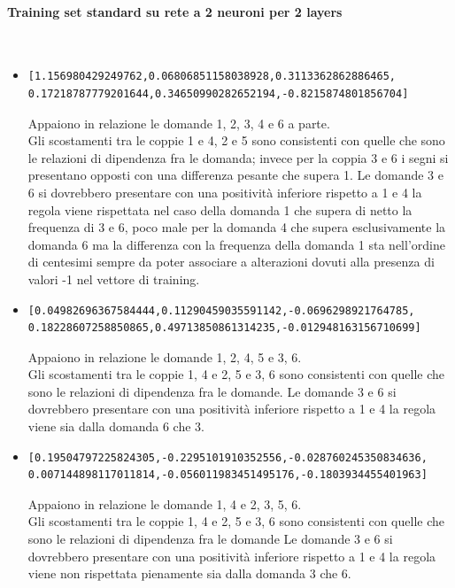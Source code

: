 \paragraph{Training set standard su rete a 2 neuroni per 2 layers}\mbox{}
\label{Training set standard su rete a 2 neuroni}
\\
\noindent
\begin{itemize}
\item \begin{verbatim}[1.156980429249762,0.06806851158038928,0.3113362862886465,
0.17218787779201644,0.34650990282652194,-0.8215874801856704]\end{verbatim}
Appaiono in relazione le domande 1, 2, 3, 4  e 6 a parte.\\
Gli scostamenti tra le coppie  1 e 4, 2 e 5 sono consistenti con quelle che sono le relazioni di dipendenza fra le domanda; invece per la coppia 3 e 6 i segni si presentano opposti  con una differenza pesante che supera 1.
Le domande 3 e 6 si dovrebbero presentare con una positivit\`a inferiore rispetto a 1 e 4 la regola viene rispettata nel caso della domanda 1 che supera di netto la frequenza di 3 e 6, poco male per la domanda 4 che supera esclusivamente la domanda 6 ma la differenza con la frequenza della domanda 1 sta nell'ordine di centesimi sempre da poter associare a alterazioni dovuti alla presenza di valori -1 nel vettore di training.

\item \begin{verbatim}[0.04982696367584444,0.11290459035591142,-0.0696298921764785, 
0.18228607258850865,0.49713850861314235,-0.012948163156710699]\end{verbatim}
Appaiono in relazione le domande 1, 2, 4, 5 e 3, 6.\\
Gli scostamenti tra le coppie 1, 4 e 2, 5  e 3, 6 sono consistenti con quelle che sono le relazioni di dipendenza fra le domande.
Le domande 3 e 6 si dovrebbero presentare con una positivit\`a inferiore rispetto a 1 e 4 la regola viene sia dalla domanda 6 che 3.

\item \begin{verbatim}[0.19504797225824305,-0.2295101910352556,-0.028760245350834636,
0.007144898117011814,-0.056011983451495176,-0.1803934455401963]\end{verbatim}
Appaiono in relazione le domande 1, 4 e 2, 3, 5, 6.\\
Gli scostamenti tra le coppie 1, 4 e 2, 5 e 3, 6 sono consistenti con quelle che sono le relazioni di dipendenza fra le domande
Le domande 3 e 6 si dovrebbero presentare con una positivit\`a inferiore rispetto a 1 e 4 la regola viene non rispettata pienamente sia dalla domanda 3 che 6.


\end{itemize}
